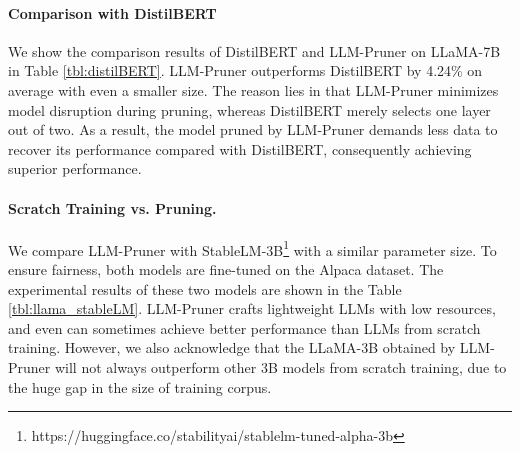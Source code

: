 \documentclass{article}
\begin{document}
\begin{table}
    \centering
    \vspace{-4mm}
    \caption{DistilBert vs. LLM-Pruner. The average here means the average score on the above seven datasets.} \label{tbl:distilBERT}
\end{table}

\paragraph{Comparison with DistilBERT} We show the comparison results of DistilBERT and LLM-Pruner on LLaMA-7B in Table \ref{tbl:distilBERT}. LLM-Pruner outperforms DistilBERT by 4.24\% on average with even a smaller size. The reason lies in that LLM-Pruner minimizes model disruption during pruning, whereas DistilBERT merely selects one layer out of two. As a result, the model pruned by LLM-Pruner demands less data to recover its performance compared with DistilBERT, consequently achieving superior performance.

\paragraph{Scratch Training vs. Pruning.} We compare LLM-Pruner with StableLM-3B\footnote{https://huggingface.co/stabilityai/stablelm-tuned-alpha-3b} with a similar parameter size. To ensure fairness, both models are fine-tuned on the Alpaca dataset. The experimental results of these two models are shown in the Table \ref{tbl:llama_stableLM}. 
LLM-Pruner crafts lightweight LLMs with low resources, and even can sometimes achieve better performance than LLMs from scratch training. However, we also acknowledge that the LLaMA-3B obtained by LLM-Pruner will not always outperform other 3B models from scratch training, due to the huge gap in the size of training corpus.  
\end{document}
